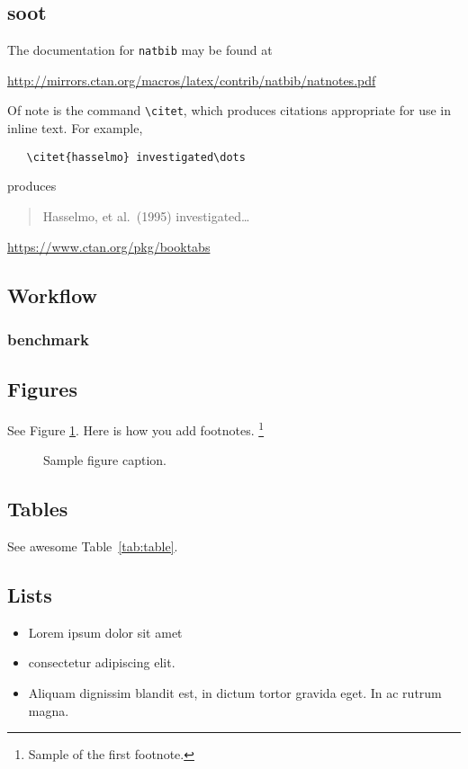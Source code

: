 \documentclass{article}
\begin{document}
\subsection{soot}
\lipsum[8] 
\label{sec:FlowDroid}
The documentation for \verb+natbib+ may be found at
\begin{center}
  \url{http://mirrors.ctan.org/macros/latex/contrib/natbib/natnotes.pdf}
\end{center}
Of note is the command \verb+\citet+, which produces citations
appropriate for use in inline text.  For example,
\begin{verbatim}
   \citet{hasselmo} investigated\dots
\end{verbatim}
produces
\begin{quote}
  Hasselmo, et al.\ (1995) investigated\dots
\end{quote}

\begin{center}
  \url{https://www.ctan.org/pkg/booktabs}
\end{center}

\subsection{Workflow}
\lipsum[5]
\subsubsection{benchmark}
\lipsum[5]

\subsection{Figures}
\lipsum[10] 
See Figure \ref{fig:fig1}. Here is how you add footnotes. \footnote{Sample of the first footnote.}
\lipsum[11] 

\begin{figure}
  \centering
  \fbox{\rule[-.5cm]{4cm}{4cm} \rule[-.5cm]{4cm}{0cm}}
  \caption{Sample figure caption.}
  \label{fig:fig1}
\end{figure}

\subsection{Tables}
\lipsum[12]
See awesome Table~\ref{tab:table}.



\subsection{Lists}
\begin{itemize}
\item Lorem ipsum dolor sit amet
\item consectetur adipiscing elit. 
\item Aliquam dignissim blandit est, in dictum tortor gravida eget. In ac rutrum magna.
\end{itemize}
\end{document}
